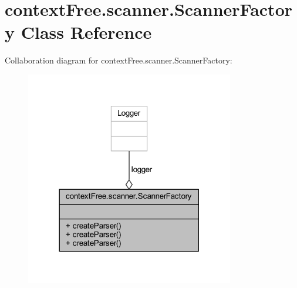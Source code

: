 \hypertarget{classcontext_free_1_1scanner_1_1_scanner_factory}{\section{context\-Free.\-scanner.\-Scanner\-Factory Class Reference}
\label{classcontext_free_1_1scanner_1_1_scanner_factory}
}


Collaboration diagram for context\-Free.\-scanner.\-Scanner\-Factory\-:\nopagebreak
\begin{figure}[H]
\begin{center}
\leavevmode
\includegraphics[width=258pt]{classcontext_free_1_1scanner_1_1_scanner_factory__coll__graph}
\end{center}
\end{figure}
